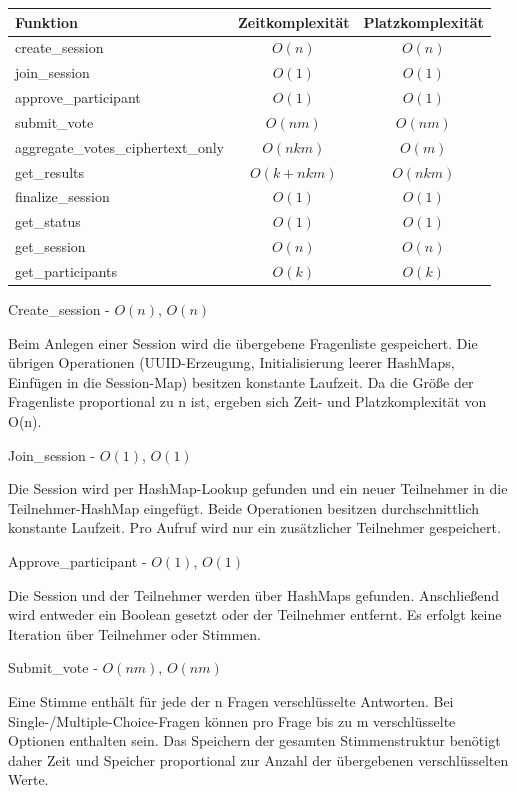 \begin{table}[h]
\centering
\begin{tabular}{|l|c|c|}
\hline
\textbf{Funktion} & \textbf{Zeitkomplexität} & \textbf{Platzkomplexität} \\
\hline
create\_session & $O(n)$ & $O(n)$ \\
\hline
join\_session & $O(1)$ & $O(1)$ \\
\hline
approve\_participant & $O(1)$ & $O(1)$ \\
\hline
submit\_vote & $O(nm)$ & $O(nm)$ \\
\hline
aggregate\_votes\_ciphertext\_only & $O(nkm)$ & $O(m)$ \\
\hline
get\_results & $O(k + nkm)$ & $O(nkm)$ \\
\hline
finalize\_session & $O(1)$ & $O(1)$ \\
\hline
get\_status & $O(1)$ & $O(1)$ \\
\hline
get\_session & $O(n)$ & $O(n)$ \\
\hline
get\_participants & $O(k)$ & $O(k)$ \\
\hline
\end{tabular}
\end{table}

Create\_session - $O(n)$, $O(n)$

Beim Anlegen einer Session wird die übergebene Fragenliste gespeichert. Die übrigen Operationen (UUID-Erzeugung, Initialisierung leerer HashMaps, Einfügen in die Session-Map) besitzen konstante Laufzeit. Da die Größe der Fragenliste proportional zu n ist, ergeben sich Zeit- und Platzkomplexität von O(n).

Join\_session - $O(1)$, $O(1)$

Die Session wird per HashMap-Lookup gefunden und ein neuer Teilnehmer in die Teilnehmer-HashMap eingefügt. Beide Operationen besitzen durchschnittlich konstante Laufzeit. Pro Aufruf wird nur ein zusätzlicher Teilnehmer gespeichert.

Approve\_participant - $O(1)$, $O(1)$

Die Session und der Teilnehmer werden über HashMaps gefunden. Anschließend wird entweder ein Boolean gesetzt oder der Teilnehmer entfernt. Es erfolgt keine Iteration über Teilnehmer oder Stimmen.

Submit\_vote - $O(nm)$, $O(nm)$

Eine Stimme enthält für jede der n Fragen verschlüsselte Antworten. Bei Single-/Multiple-Choice-Fragen können pro Frage bis zu m verschlüsselte Optionen enthalten sein. Das Speichern der gesamten Stimmenstruktur benötigt daher Zeit und Speicher proportional zur Anzahl der übergebenen verschlüsselten Werte.

